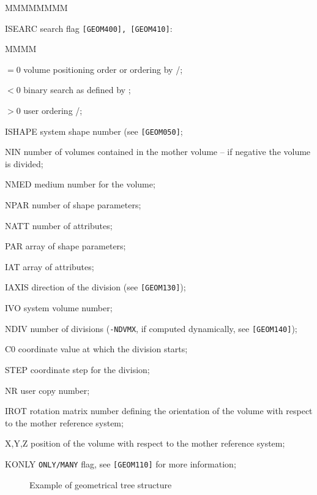 \begin{DLtt}{MMMMMMMM}
\item[ISEARC] search flag {\tt [GEOM400], [GEOM410]}:
\begin{DLtt}{MMMM}
\item[$=$0] volume positioning order or ordering by /;
\item[$<$0] binary search as defined by ;
\item[$>$0] user ordering /;
\end{DLtt}
\item[ISHAPE] system shape number (see {\tt [GEOM050]};
\item[NIN] number of volumes contained in the mother volume --
if negative the volume is divided;
\item[NMED] medium number for the volume;
\item[NPAR] number of shape parameters;
\item[NATT] number of attributes;
\item[PAR] array of shape parameters;
\item[IAT] array of attributes;
\item[IAXIS] direction of the division (see {\tt [GEOM130]});
\item[IVO] system volume number;
\item[NDIV] number of divisions ({\tt -NDVMX}, if computed dynamically,
see {\tt [GEOM140]});
\item[C0] coordinate value at which the division starts;
\item[STEP] coordinate step for the division;
\item[NR] user copy number;
\item[IROT] rotation matrix number defining the orientation of the volume
with respect to the mother reference system;
\item[X,Y,Z] position of the volume with respect to the mother reference
system;
\item[KONLY] {\tt ONLY/MANY} flag, see {\tt [GEOM110]} for more information;
\end{DLtt}
 
\begin{figure}[hbt]
     \centering
     \caption{Example of geometrical tree structure}
     \label{fg:geom199-1}
\end{figure}
